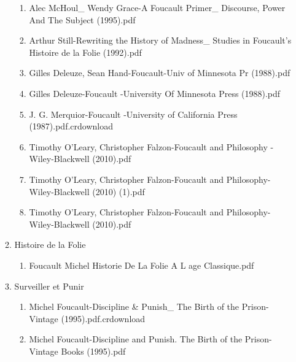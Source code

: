 \documentclass[11pt]{article}
\begin{document}
\begin{enumerate}
\begin{enumerate}
\begin{enumerate}
\item Alec McHoul\_ Wendy Grace-A Foucault Primer\_ Discourse, Power And The Subject (1995).pdf
\label{sec-1-1-1-1-11-29-20-16-3}

\item Arthur Still-Rewriting the History of Madness\_ Studies in Foucault's Histoire de la Folie (1992).pdf
\label{sec-1-1-1-1-11-29-20-16-4}

\item Gilles Deleuze, Sean Hand-Foucault-Univ of Minnesota Pr (1988).pdf
\label{sec-1-1-1-1-11-29-20-16-5}

\item Gilles Deleuze-Foucault  -University Of Minnesota Press (1988).pdf
\label{sec-1-1-1-1-11-29-20-16-6}

\item J. G. Merquior-Foucault  -University of California Press (1987).pdf.crdownload
\label{sec-1-1-1-1-11-29-20-16-7}

\item Timothy O'Leary, Christopher Falzon-Foucault and Philosophy  -Wiley-Blackwell (2010).pdf
\label{sec-1-1-1-1-11-29-20-16-8}

\item Timothy O'Leary, Christopher Falzon-Foucault and Philosophy-Wiley-Blackwell (2010) (1).pdf
\label{sec-1-1-1-1-11-29-20-16-9}

\item Timothy O'Leary, Christopher Falzon-Foucault and Philosophy-Wiley-Blackwell (2010).pdf
\label{sec-1-1-1-1-11-29-20-16-10}
\end{enumerate}

\item Histoire de la Folie
\label{sec-1-1-1-1-11-29-20-17}
\begin{enumerate}
\item Foucault Michel  Historie De La Folie A L age Classique.pdf
\label{sec-1-1-1-1-11-29-20-17-1}
\end{enumerate}

\item Surveiller et Punir
\label{sec-1-1-1-1-11-29-20-18}
\begin{enumerate}
\item Michel Foucault-Discipline \& Punish\_ The Birth of the Prison-Vintage (1995).pdf.crdownload
\label{sec-1-1-1-1-11-29-20-18-1}

\item Michel Foucault-Discipline and Punish. The Birth of the Prison-Vintage Books (1995).pdf
\label{sec-1-1-1-1-11-29-20-18-2}


\end{enumerate}
\end{enumerate}
\end{enumerate}
\end{document}
